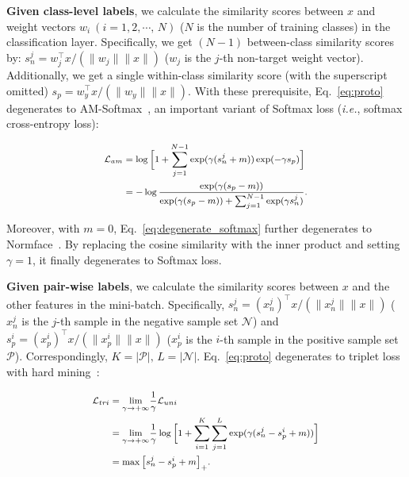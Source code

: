 \documentclass[10pt,twocolumn,letterpaper]{article}
\begin{document}
\textbf{Given class-level labels}, we calculate the similarity scores between $x$ and weight vectors $w_i~(i=1,2,\cdots,\,N)$ ($N$ is the number of training classes) in the classification layer. Specifically, we get $(N-1)$ between-class similarity scores by: $s_n^j=w_j^\intercal x/(\|w_j\|\|x\|)$ ($w_j$ is the $j$-th non-target weight vector). Additionally, we get a single within-class similarity score (with the superscript omitted) $s_p=w_y^\intercal x/(\|w_y\|\|x\|)$. 
With these prerequisite, Eq.~\ref{eq:proto} degenerates to AM-Softmax~\cite{wang2018additive,Wang_2018_CVPR}, an important variant of Softmax loss (\emph{i.e.}, softmax cross-entropy loss):

\begin{equation}\label{eq:degenerate_softmax}
\footnotesize{
\begin{aligned}
\mathcal{L}_{am}
&=\log\Big[1+\sum_{j=1}^{N-1}\exp(\gamma (s_n^j+m))\exp(-\gamma s_p)\Big]\\
&=-\log\frac{\exp(\gamma (s_p-m))}{\exp(\gamma (s_p-m))+\sum_{j=1}^{N-1}\exp(\gamma s_n^j)}.\\
\end{aligned}
}
\end{equation} 

Moreover, with $m=0$, Eq.~\ref{eq:degenerate_softmax} further degenerates to Normface~\cite{wang2017normface}.
By replacing the cosine similarity with the inner product and setting $\gamma=1$, it finally degenerates to Softmax loss.

\textbf{Given pair-wise labels}, we calculate the similarity scores between $x$ and the other features in the mini-batch. Specifically,
$s_n^j=(x_n^j)^\intercal x/(\|x_n^j\|\|x\|)$ ($x_n^j$ is the $j$-th sample in the negative sample set $\mathcal{N}$) and $s_p^i=(x_p^i)^\intercal x/(\|x_p^i\|\|x\|)$ ($x_p^i$ is the $i$-th sample in the positive sample set $\mathcal{P}$). Correspondingly, $K=|\mathcal{P}|,\,L=|\mathcal{N}|$. Eq.~\ref{eq:proto} degenerates to triplet loss with hard mining~\cite{schroff2015facenet, hermans2017defense}:

\begin{equation}\label{eq:degenerate_triplet}
 \footnotesize{
\begin{aligned}
\mathcal{L}_{tri}&={\lim_{\gamma \to +\infty}}\frac{1}{\gamma}\mathcal{L}_{uni}\\
&={\lim_{\gamma \to +\infty}}\frac{1}{\gamma}\log\Big[1+\sum_{i=1}^{K}\sum_{j=1}^{L}\exp(\gamma (s_n^j -s_p^i+m))\Big]\\
&=\max\big[s_n^j-s_p^i+m\big]_+.\\
\end{aligned}
}
\end{equation} 
\end{document}
